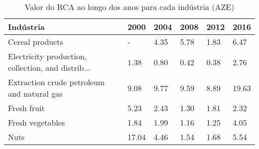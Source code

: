 \begin{table}
\centering
\caption{Valor do RCA ao longo dos anos para cada indústria (AZE)}
\begin{tabular}{p{6cm}p{1.5cm}p{1.5cm}p{1.5cm}p{1.5cm}p{1.5cm}}
\toprule
                                         Indústria &  2000 & 2004 & 2008 & 2012 &  2016 \\
\midrule
                                   Cereal products &     - & 4.35 & 5.78 & 1.83 &  6.47 \\
Electricity production, collection, and distrib... &  1.38 & 0.80 & 0.42 & 0.38 &  2.76 \\
        Extraction crude petroleum and natural gas &  9.08 & 9.77 & 9.59 & 8.89 & 19.63 \\
                                       Fresh fruit &  5.23 & 2.43 & 1.30 & 1.81 &  2.32 \\
                                  Fresh vegetables &  1.84 & 1.99 & 1.16 & 1.25 &  4.05 \\
                                              Nuts & 17.04 & 4.46 & 1.54 & 1.68 &  5.54 \\
\bottomrule
\end{tabular}
\end{table}
